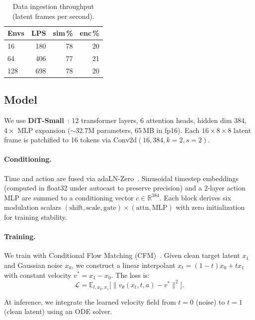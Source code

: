 \documentclass[letterpaper,twocolumn,10pt]{article}
\begin{document}
\begin{table}[H]
\centering
\caption{Data ingestion throughput (latent frames per second).}
\label{tab:ingest}
\begin{tabular}{@{}lrrr@{}}
\toprule
\textbf{Envs} & \textbf{LPS} & \textbf{sim\,\%} & \textbf{enc\,\%} \\
\midrule
16  & 180 & 78 & 20 \\
64  & 406 & 77 & 21 \\
128 & 698 & 78 & 20 \\
\bottomrule
\end{tabular}
\end{table}

\subsection{Model}

We use \textbf{DiT-Small}~\cite{peebles2023dit}: 12 transformer
layers, 6 attention heads, hidden dim 384, $4\times$ MLP expansion
($\sim$32.7M parameters, 65\,MB in fp16).  Each $16{\times}8{\times}8$
latent frame is patchified to 16 tokens via
$\text{Conv2d}(16, 384, k{=}2, s{=}2)$.

\paragraph{Conditioning.}
Time and action are fused via adaLN-Zero~\cite{peebles2023dit}.
Sinusoidal timestep embeddings (computed in float32 under autocast to
preserve precision) and a 2-layer action MLP are summed to a
conditioning vector $c \in \mathbb{R}^{384}$.  Each block derives six
modulation scalars $(\text{shift}, \text{scale}, \text{gate}) \times
(\text{attn}, \text{MLP})$ with zero initialization for training
stability.

\paragraph{Training.}
We train with Conditional Flow Matching (CFM)~\cite{lipman2023flow}.
Given clean target latent $x_1$ and Gaussian noise $x_0$, we construct
a linear interpolant $x_t = (1-t)x_0 + t x_1$ with constant velocity
$v^* = x_1 - x_0$.  The loss is:
\begin{equation}
  \mathcal{L} = \mathbb{E}_{t,x_0,x_1}
    \bigl[\lVert v_\theta(x_t, t, a) - v^* \rVert^2\bigr].
\end{equation}

At inference, we integrate the learned velocity field from $t=0$ (noise)
to $t=1$ (clean latent) using an ODE solver.
\end{document}
